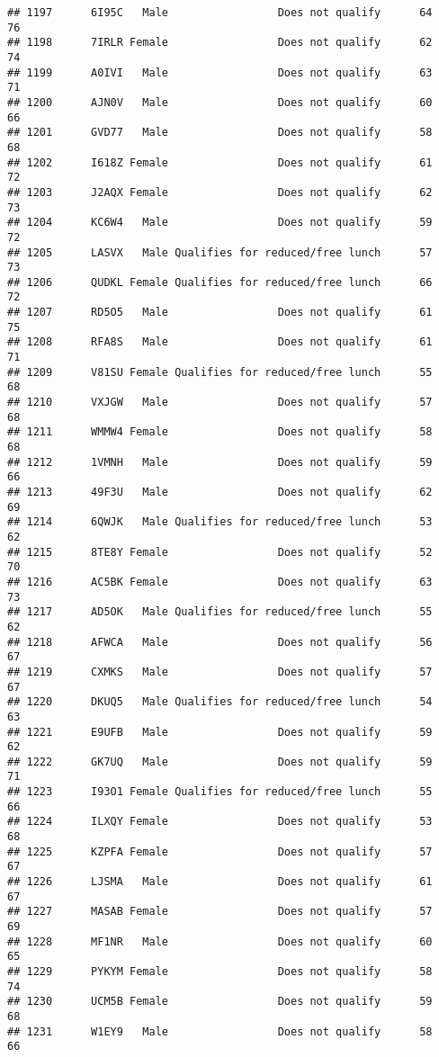 \documentclass[
]{article}
\begin{document}
\begin{verbatim}
## 1197      6I95C   Male                 Does not qualify      64       76
## 1198      7IRLR Female                 Does not qualify      62       74
## 1199      A0IVI   Male                 Does not qualify      63       71
## 1200      AJN0V   Male                 Does not qualify      60       66
## 1201      GVD77   Male                 Does not qualify      58       68
## 1202      I618Z Female                 Does not qualify      61       72
## 1203      J2AQX Female                 Does not qualify      62       73
## 1204      KC6W4   Male                 Does not qualify      59       72
## 1205      LASVX   Male Qualifies for reduced/free lunch      57       73
## 1206      QUDKL Female Qualifies for reduced/free lunch      66       72
## 1207      RD5O5   Male                 Does not qualify      61       75
## 1208      RFA8S   Male                 Does not qualify      61       71
## 1209      V81SU Female Qualifies for reduced/free lunch      55       68
## 1210      VXJGW   Male                 Does not qualify      57       68
## 1211      WMMW4 Female                 Does not qualify      58       68
## 1212      1VMNH   Male                 Does not qualify      59       66
## 1213      49F3U   Male                 Does not qualify      62       69
## 1214      6QWJK   Male Qualifies for reduced/free lunch      53       62
## 1215      8TE8Y Female                 Does not qualify      52       70
## 1216      AC5BK Female                 Does not qualify      63       73
## 1217      AD5OK   Male Qualifies for reduced/free lunch      55       62
## 1218      AFWCA   Male                 Does not qualify      56       67
## 1219      CXMKS   Male                 Does not qualify      57       67
## 1220      DKUQ5   Male Qualifies for reduced/free lunch      54       63
## 1221      E9UFB   Male                 Does not qualify      59       62
## 1222      GK7UQ   Male                 Does not qualify      59       71
## 1223      I93O1 Female Qualifies for reduced/free lunch      55       66
## 1224      ILXQY Female                 Does not qualify      53       68
## 1225      KZPFA Female                 Does not qualify      57       67
## 1226      LJSMA   Male                 Does not qualify      61       67
## 1227      MASAB Female                 Does not qualify      57       69
## 1228      MF1NR   Male                 Does not qualify      60       65
## 1229      PYKYM Female                 Does not qualify      58       74
## 1230      UCM5B Female                 Does not qualify      59       68
## 1231      W1EY9   Male                 Does not qualify      58       66

\end{verbatim}
\end{document}

